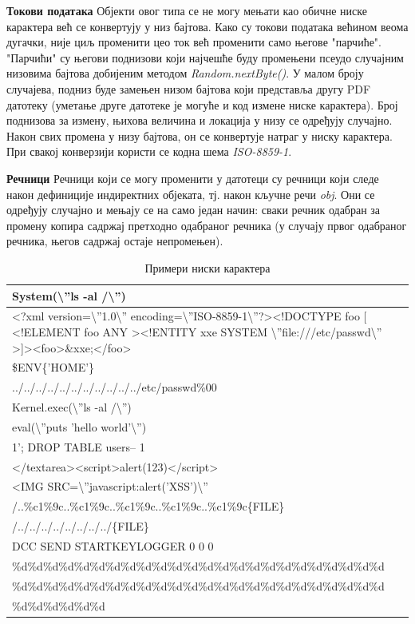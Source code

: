 \documentclass[12pt,oneside]{memoir}
\begin{document}
\begin{description}
\item{\textbf{Токови података}} Објекти овог типа се не могу мењати као обичне ниске карактера већ се конвертују у низ бајтова. Како су токови података већином веома дугачки, није циљ променити цео ток већ променити само његове "парчиће". "Парчићи" су његови поднизови који најчешће буду промењени псеудо случајним низовима бајтова добијеним методом \textit{Random.nextByte()}. У малом броју случајева, подниз буде замењен низом бајтова који представља другу PDF датотеку (уметање друге датотеке је могуће и код измене ниске карактера). Број поднизова за измену, њихова величина и локација у низу се одређују случајно. Након свих промена у низу бајтова, он се конвертује натраг у ниску карактера. При свакој конверзији користи се кодна шема \textit{ISO-8859-1}. 
\item{\textbf{Речници}} Речници који се могу променити у датотеци су речници који следе након дефиниције индиректних објеката, тј. након кључне речи \textit{obj}. Они се одређују случајно и мењају се на само један начин: сваки речник одабран за промену копира садржај претходно одабраног речника (у случају првог одабраног речника, његов садржај остаје непромењен). 
\end{description}

\begin{table}
    \begin{tabular}{| p{14cm} |}
    \hline
    System(\textbackslash''ls -al /\textbackslash'') \\ \hline
    <?xml version=\textbackslash''1.0\textbackslash'' encoding=\textbackslash''ISO-8859-1\textbackslash''?><!DOCTYPE foo [ <!ELEMENT foo ANY ><!ENTITY xxe SYSTEM \textbackslash''file:///etc/passwd\textbackslash'' >]><foo>\&xxe;</foo> \\ \hline
	\$ENV\{'HOME'\}\\ \hline
	../../../../../../../../../../../etc/passwd\%00\\ \hline
	Kernel.exec(\textbackslash''ls -al /\textbackslash'')\\ \hline
	eval(\textbackslash''puts 'hello world'\textbackslash'')\\ \hline
	1'; DROP TABLE users-- 1\\ \hline
	</textarea><script>alert(123)</script>\\ \hline
	<IMG SRC=\textbackslash''javascript:alert('XSS')\textbackslash''\\ \hline
	/..\%c1\%9c..\%c1\%9c..\%c1\%9c..\%c1\%9c..\%c1\%9c\{FILE\}\\ \hline
	/../../../../../../../../\{FILE\}\\ \hline
    	DCC SEND STARTKEYLOGGER 0 0 0 \\ \hline
\%d\%d\%d\%d\%d\%d\%d\%d\%d\%d\%d\%d\%d\%d\%d\%d\%d\%d\%d\%d\%d\%d\%d\%d \\ 
\%d\%d\%d\%d\%d\%d\%d\%d\%d\%d\%d\%d\%d\%d\%d\%d\%d\%d\%d\%d\%d\%d\%d\%d \\
\%d\%d\%d\%d\%d\%d  \\
    	\hline
    \end{tabular}
\caption{Примери ниски карактера}
\label{table:niske}
\end{table}
\end{document}
